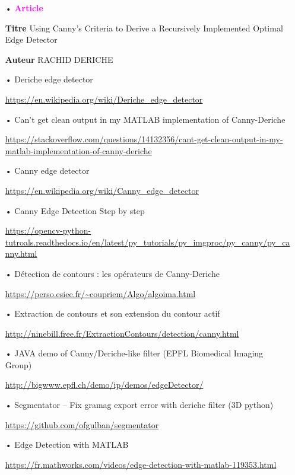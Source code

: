 \begin{itemize}

\item[•] \textbf{\textcolor{magenta}{Article}}
\item[\textbf{Titre}] Using Canny's Criteria to Derive a Recursively Implemented Optimal Edge
Detector
\item[\textbf{Auteur}] RACHID DERICHE
\item[]

\item[•] Deriche edge detector
\item[] \url{https://en.wikipedia.org/wiki/Deriche_edge_detector} 

\item[•] Can't get clean output in my MATLAB implementation of Canny-Deriche
\item[] \url{https://stackoverflow.com/questions/14132356/cant-get-clean-output-in-my-matlab-implementation-of-canny-deriche} 

\item[•] Canny edge detector
\item[] \url{https://en.wikipedia.org/wiki/Canny_edge_detector} 

\item[•] Canny Edge Detection Step by step
\item[] \url{https://opencv-python-tutroals.readthedocs.io/en/latest/py_tutorials/py_imgproc/py_canny/py_canny.html} 

\item[•] Détection de contours : les opérateurs de Canny-Deriche
\item[] \url{https://perso.esiee.fr/~coupriem/Algo/algoima.html} 

\item[•] Extraction de contours et son extension du contour actif
\item[]
\url{http://ninebill.free.fr/ExtractionContours/detection/canny.html}

\item[•] JAVA demo of Canny/Deriche-like filter (EPFL Biomedical Imaging Group)
\item[] \url{http://bigwww.epfl.ch/demo/ip/demos/edgeDetector/} 

\item[•] Segmentator \--- Fix gramag export error with deriche filter (3D python)
\item[] \url{https://github.com/ofgulban/segmentator} 

\item[•] Edge Detection with MATLAB
\item[] \url{https://fr.mathworks.com/videos/edge-detection-with-matlab-119353.html} 


\end{itemize}
